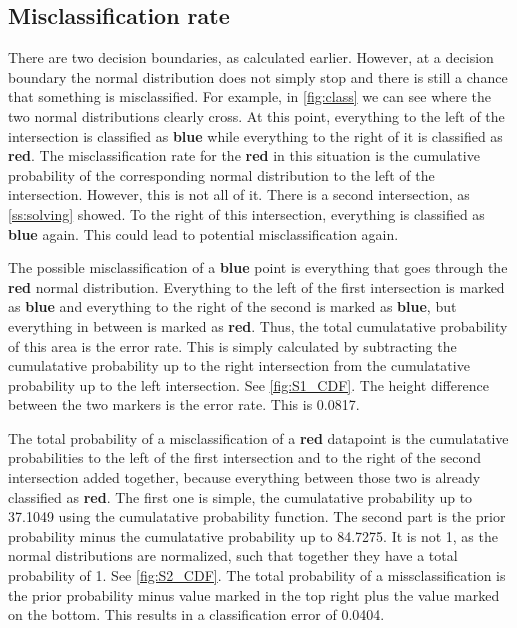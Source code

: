 \documentclass[10pt,a4paper]{article}
\begin{document}
\subsection{Misclassification rate}
There are two decision boundaries, as calculated earlier. However, at a decision boundary the normal distribution does not simply stop and there is still a chance that something is misclassified. For example, in \autoref{fig:class} we can see where the two normal distributions clearly cross. At this point, everything to the left of the intersection is classified as \textbf{blue} while everything to the right of it is classified as \textbf{red}. The misclassification rate for the \textbf{red} in this situation is the cumulative probability of the corresponding normal distribution to the left of the intersection. However, this is not all of it. There is a second intersection, as \autoref{ss:solving} showed. To the right of this intersection, everything is classified as \textbf{blue} again. This could lead to potential misclassification again. 

The possible misclassification of a \textbf{blue} point is everything that goes through the \textbf{red} normal distribution. Everything to the left of the first intersection is marked as \textbf{blue} and everything to the right of the second is marked as \textbf{blue}, but everything in between is marked as \textbf{red}. Thus, the total cumulatative probability of this area is the error rate. This is simply calculated by subtracting the cumulatative probability up to the right intersection from the cumulatative probability up to the left intersection. See \autoref{fig:S1_CDF}. The height difference between the two markers is the error rate. This is 0.0817.

The total probability of a misclassification of a \textbf{red} datapoint is the cumulatative probabilities to the left of the first intersection and to the right of the second intersection added together, because everything between those two is already classified as \textbf{red}.
The first one is simple, the cumulatative probability up to 37.1049 using the cumulatative probability function. The second part is the prior probability minus the cumulatative probability up to 84.7275. It is not 1, as the normal distributions are normalized, such that together they have a total probability of 1.
See \autoref{fig:S2_CDF}. The total probability of a missclassification is the prior probability minus value marked in the top right plus the value marked on the bottom. This results in a classification error of 0.0404.
\end{document}
